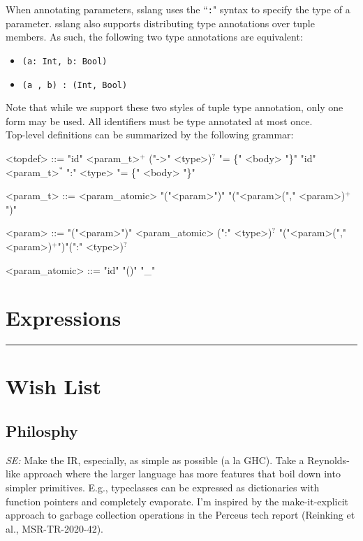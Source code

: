 \documentclass{article}
\begin{document}
When annotating parameters, sslang uses the ``\texttt{:}" syntax to specify the type of a parameter. sslang also supports distributing type annotations over tuple members. As such, the following two type annotations are equivalent:
\begin{itemize}
    \item \texttt{(a: Int, b: Bool)}
    \item \texttt{(a , b) : (Int, Bool)}
\end{itemize}

Note that while we support these two styles of tuple type annotation, only one form may be used. All identifiers must be type annotated at most once. \\

Top-level definitions can be summarized by the following grammar:
\setlength{\grammarindent}{9em}
\begin{grammar}
<topdef> ::= "id" <param_t>$^{+}$ ("->" <type>)$^{?}$ "= \{" <body> "\}"
\alt "id" <param_t>$^{*}$ ":" <type> "= \{" <body> "\}"

<param_t> ::= <param_atomic>
\alt "("<param>")"
\alt "("<param>("," <param>)$^{+}$")"

<param> ::= "("<param>")"
\alt <param_atomic> (":" <type>)$^{?}$
\alt "("<param>(","<param>)$^{+}$")"(":" <type>)$^{?}$

<param_atomic> ::= "id"
\alt "()"
\alt "_"
\end{grammar}

\section{Expressions}


\newpage

\hrule

\section{Wish List}

\subsection{Philosphy}

\textit{SE:} Make the IR, especially, as simple as possible (a la
GHC). Take a Reynolds-like approach where the larger language has more
features that boil down into simpler primitives.  E.g., typeclasses
can be expressed as dictionaries with function pointers and completely
evaporate.  I'm inspired by the make-it-explicit approach to garbage
collection operations in the Perceus tech report (Reinking et al.,
MSR-TR-2020-42).
\end{document}
